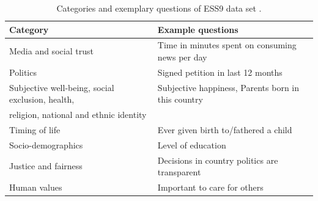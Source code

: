 \documentclass[10pt]{article}
\begin{document}
	\begin{table}[h!]
		\centering
		\begin{tabular}{@{}ll@{}}
			\toprule
			Category & Example questions\\ \midrule
			Media and social trust & Time in minutes spent on consuming news per day\\ 
			Politics & Signed petition in last 12 months\\ 
			Subjective well-being, social exclusion, health, & Subjective happiness, Parents born in this country\\ religion, national and ethnic identity &  \\ 
			Timing of life & Ever given birth to/fathered a child\\ 
			Socio-demographics & Level of education\\ 
			Justice and fairness & Decisions in country politics are transparent\\
			Human values & Important to care for others \\ \bottomrule
		\end{tabular}
		\caption{Categories and exemplary questions of ESS9 data set \cite{ESS9_data_documentation:2021}.}
		\label{tab:ess9_categories}
	\end{table}
	
\end{document}
